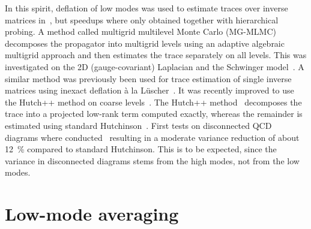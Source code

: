 In this spirit, deflation of low modes was used to estimate traces over inverse matrices in~\cite{Gambhir:2016uwp,Alcalde_2017}, but speedups where only obtained together with hierarchical probing.
A method called multigrid multilevel Monte Carlo (MG-MLMC) decomposes the propagator into multigrid levels using an adaptive algebraic multigrid approach and then estimates the trace separately on all levels.
This was investigated on the 2D (gauge-covariant) Laplacian and the Schwinger model~\cite{doi:10.1137/21M1441894:2022}.
A similar method was previously been used for trace estimation of single inverse matrices using inexact deflation à la Lüscher~\cite{Romero:2019psj}.
It was recently improved to use the Hutch++ method on coarse levels~\cite{Frommer:2022qiy}.
The Hutch++ method~\cite{doi:10.1137/1.9781611976496.16:2021} decomposes the trace into a projected low-rank term computed exactly, whereas the remainder is estimated using standard Hutchinson~\cite{Hutchinson01011990}.
First tests on disconnected QCD diagrams where conducted~\cite{Frommer:2025kfp} resulting in a moderate variance reduction of about \SI{12}{\percent} compared to standard Hutchinson.
This is to be expected, since the variance in disconnected diagrams stems from the high modes, not from the low modes.


\section{Low-mode averaging}

